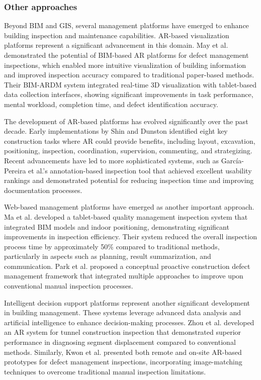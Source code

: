 \documentclass[a4paper,fleqn]{cas-sc}
\begin{document}
\subsubsection{Other approaches}

Beyond BIM and GIS, several management platforms have emerged to enhance building inspection and maintenance capabilities. AR-based visualization platforms represent a significant advancement in this domain. May et al. \cite{may2022identification} demonstrated the potential of BIM-based AR platforms for defect management inspections, which enabled more intuitive visualization of building information and improved inspection accuracy compared to traditional paper-based methods. Their BIM-ARDM system integrated real-time 3D visualization with tablet-based data collection interfaces, showing significant improvements in task performance, mental workload, completion time, and defect identification accuracy.

The development of AR-based platforms has evolved significantly over the past decade. Early implementations by Shin and Dunston \cite{shin2009framework} identified eight key construction tasks where AR could provide benefits, including layout, excavation, positioning, inspection, coordination, supervision, commenting, and strategizing. Recent advancements have led to more sophisticated systems, such as García-Pereira et al.'s \cite{garcia2020annotation} annotation-based inspection tool that achieved excellent usability rankings and demonstrated potential for reducing inspection time and improving documentation processes.

Web-based management platforms have emerged as another important approach. Ma et al. \cite{ma2021single} developed a tablet-based quality management inspection system that integrated BIM models and indoor positioning, demonstrating significant improvements in inspection efficiency. Their system reduced the overall inspection process time by approximately 50\% compared to traditional methods, particularly in aspects such as planning, result summarization, and communication. Park et al. \cite{park2013framework} proposed a conceptual proactive construction defect management framework that integrated multiple approaches to improve upon conventional manual inspection processes.

Intelligent decision support platforms represent another significant development in building management. These systems leverage advanced data analysis and artificial intelligence to enhance decision-making processes. Zhou et al. \cite{zhou2019development} developed an AR system for tunnel construction inspection that demonstrated superior performance in diagnosing segment displacement compared to conventional methods. Similarly, Kwon et al. \cite{kwon2019defect} presented both remote and on-site AR-based prototypes for defect management inspections, incorporating image-matching techniques to overcome traditional manual inspection limitations.
\end{document}
